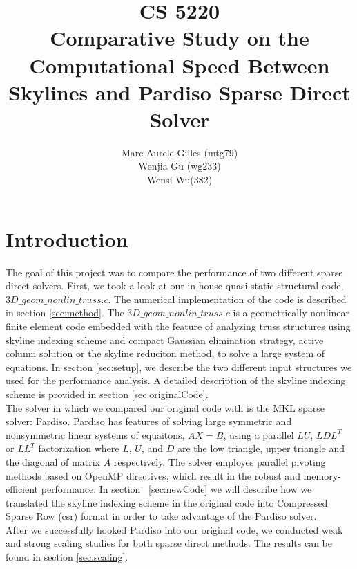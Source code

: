 \documentclass[11pt]{article}
\begin{document}
\title{CS 5220\\ Comparative Study on the Computational Speed Between Skylines and Pardiso Sparse Direct Solver}
\author{Marc Aurele Gilles (mtg79)\\ Wenjia Gu (wg233)\\Wensi Wu(382) }
\maketitle

\section{Introduction}\label{sec:intro}

The goal of this project was to compare the performance of two different sparse direct solvers. First, we took a look at our in-house quasi-static structural code, $3D\_geom\_nonlin\_truss.c$. The numerical implementation of the code is described in section \ref{sec:method}.  The $3D\_geom\_nonlin\_truss.c $ is a geometrically nonlinear finite element code embedded with the feature of analyzing truss structures using skyline indexing scheme and compact Gaussian elimination strategy, active column solution or the skyline reduciton method, to solve a large system of equations. In section \ref{sec:setup}, we describe the two different input structures we used for the performance analysis.  A detailed description of the skyline indexing scheme is provided in section \ref{sec:originalCode}. \\

The solver in which we compared our original code with is the MKL sparse solver: Pardiso. Pardiso has features of solving large symmetric and nonsymmetric linear systems of equaitons, $AX=B$, using a parallel $LU$, $LDL^T$ or $LL^T$ factorization where $L$, $U$, and $D$ are the low triangle, upper triangle and the diagonal of matrix $A$ respectively. The solver employes parallel pivoting methods based on OpenMP directives, which result in the robust and memory-efficient performance. In section ~\ref{sec:newCode} we will describe how we translated the skyline indexing scheme in the original code into Compressed Sparse Row (csr) format in order to take advantage of the Pardiso solver.\\

After we successfully hooked Pardiso into our original code, we conducted weak and strong scaling studies for both sparse direct methods. The results can be found in section \ref{sec:scaling}.  
\end{document}
